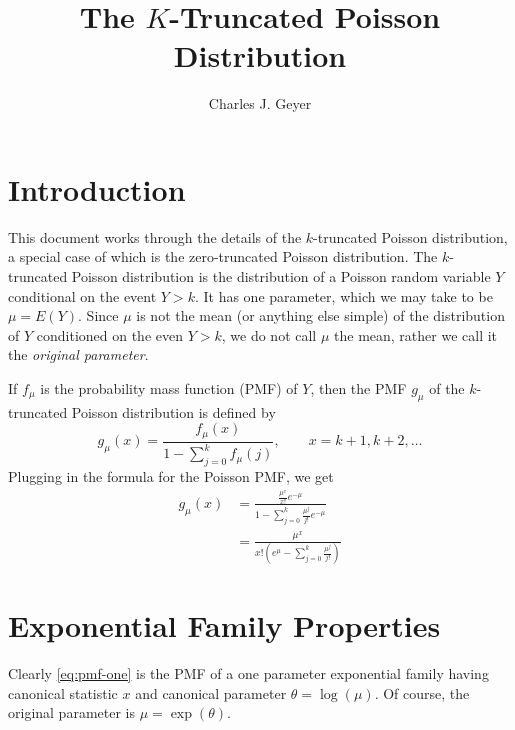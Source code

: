\documentclass[11pt]{article}
\begin{document}
\title{The $K$-Truncated Poisson Distribution}
\author{Charles J. Geyer}
\maketitle

\section{Introduction}

This document works through the details of the $k$-truncated Poisson distribution,
a special case of which is the zero-truncated Poisson distribution.  The $k$-truncated Poisson
distribution is the distribution of a Poisson random variable $Y$ conditional on the event
$Y > k$.  It has one parameter, which we may take to be $\mu = E(Y)$.
Since $\mu$ is not the mean (or anything else simple) of the distribution of $Y$ conditioned
on the even $Y > k$, we do not call $\mu$ the mean, rather we call it
the \emph{original parameter}.

If $f_\mu$ is the probability mass function (PMF) of $Y$, then the
PMF $g_\mu$ of the $k$-truncated Poisson distribution is
defined by
\begin{equation} \label{eq:pmf-one}
    g_\mu(x)
    =
    \frac{f_\mu(x)}{1 - \sum_{j = 0}^k f_\mu(j)},
    \qquad x = k + 1, k + 2, \ldots
\end{equation}
Plugging in the formula for the Poisson PMF, we get
\begin{equation} \label{eq:pmf-two}
\begin{split}
    g_\mu(x)
    & =
    \frac{\frac{\mu^x}{x !} e^{- \mu}}{1 - \sum_{j = 0}^k \frac{\mu^j}{j !} e^{- \mu}}
    \\
    & =
    \frac{\mu^x}{x ! (e^\mu - \sum_{j = 0}^k \frac{\mu^j}{j !})}
\end{split}
\end{equation}

\section{Exponential Family Properties}

Clearly \eqref{eq:pmf-one} is the PMF of a one parameter exponential family having
canonical statistic $x$ and canonical parameter $\theta = \log(\mu)$.
Of course, the original parameter is $\mu = \exp(\theta)$.
\end{document}
